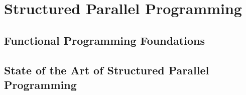 \section{Structured Parallel Programming}

\subsection{Functional Programming Foundations}

\subsection{State of the Art of Structured Parallel Programming}




